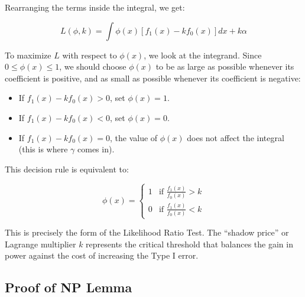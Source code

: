 \documentclass[
  letterpaper,
  DIV=11,
  numbers=noendperiod]{scrreprt}
\providecommand{\tightlist}{%
  \setlength{\itemsep}{0pt}\setlength{\parskip}{0pt}}
\renewcommand{\[}{\begin{equation}}
\renewcommand{\]}{\end{equation}}
\theoremstyle{definition}
\theoremstyle{plain}
\theoremstyle{plain}
\theoremstyle{plain}
\theoremstyle{definition}
\theoremstyle{plain}
\theoremstyle{remark}
\begin{document}
Rearranging the terms inside the integral, we get:

\[
L(\phi, k) = \int \phi(x) [f_1(x) - k f_0(x)] dx + k\alpha
\]

To maximize \(L\) with respect to \(\phi(x)\), we look at the integrand.
Since \(0 \le \phi(x) \le 1\), we should choose \(\phi(x)\) to be as
large as possible whenever its coefficient is positive, and as small as
possible whenever its coefficient is negative:

\begin{itemize}
\tightlist
\item
  If \(f_1(x) - k f_0(x) > 0\), set \(\phi(x) = 1\).
\item
  If \(f_1(x) - k f_0(x) < 0\), set \(\phi(x) = 0\).
\item
  If \(f_1(x) - k f_0(x) = 0\), the value of \(\phi(x)\) does not affect
  the integral (this is where \(\gamma\) comes in).
\end{itemize}

This decision rule is equivalent to:

\[
\phi(x) = 
\begin{cases} 
1 & \text{if } \frac{f_1(x)}{f_0(x)} > k \\
0 & \text{if } \frac{f_1(x)}{f_0(x)} < k
\end{cases}
\]

This is precisely the form of the Likelihood Ratio Test. The ``shadow
price'' or Lagrange multiplier \(k\) represents the critical threshold
that balances the gain in power against the cost of increasing the Type
I error.

\subsection{Proof of NP Lemma}\label{proof-of-np-lemma}
\end{document}
